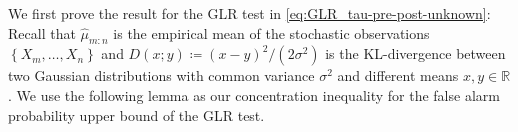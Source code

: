 \documentclass[12pt]{interact}
\newcommand{\lp}{\left(}
\newcommand{\rp}{\right)}
\newcommand{\lb}{\left[}
\newcommand{\rb}{\right]}
\newcommand{\lbp}{\left\{}
\newcommand{\rbp}{\right\}}
\newcommand{\mbb}{\mathbb}
\theoremstyle{plain}
\newtheorem{lemma}{Lemma}
\begin{document}
We first prove the result for the GLR test in \eqref{eq:GLR_tau-pre-post-unknown}: Recall that $\hat{\mu}_{m:n}$ is the empirical mean of the stochastic observations $\lbp X_{m}, \dots, X_{n} \rbp$ and \textup{$ D \lp x;y\rp\coloneqq(x-y)^{2}/(2\sigma^{2})$} is the KL-divergence between two Gaussian distributions with common variance $\sigma^{2}$ and different means $x,y\in\mbb{R}$. We use the following lemma as our concentration inequality for the false alarm probability upper bound of the GLR test.
%

\end{document}
